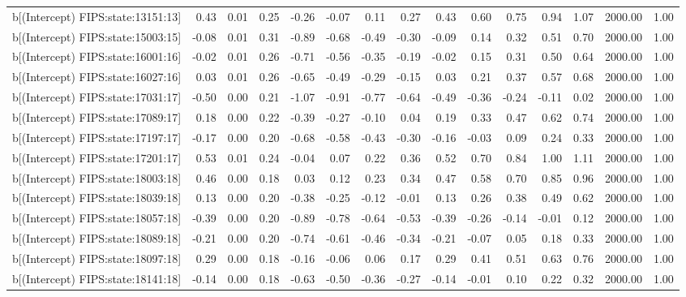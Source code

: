 \begin{table}[ht]
\begin{tabular}{rrrrrrrrrrrrrrr}
  b[(Intercept) FIPS:state:13151:13] & 0.43 & 0.01 & 0.25 & -0.26 & -0.07 & 0.11 & 0.27 & 0.43 & 0.60 & 0.75 & 0.94 & 1.07 & 2000.00 & 1.00 \\ 
  b[(Intercept) FIPS:state:15003:15] & -0.08 & 0.01 & 0.31 & -0.89 & -0.68 & -0.49 & -0.30 & -0.09 & 0.14 & 0.32 & 0.51 & 0.70 & 2000.00 & 1.00 \\ 
  b[(Intercept) FIPS:state:16001:16] & -0.02 & 0.01 & 0.26 & -0.71 & -0.56 & -0.35 & -0.19 & -0.02 & 0.15 & 0.31 & 0.50 & 0.64 & 2000.00 & 1.00 \\ 
  b[(Intercept) FIPS:state:16027:16] & 0.03 & 0.01 & 0.26 & -0.65 & -0.49 & -0.29 & -0.15 & 0.03 & 0.21 & 0.37 & 0.57 & 0.68 & 2000.00 & 1.00 \\ 
  b[(Intercept) FIPS:state:17031:17] & -0.50 & 0.00 & 0.21 & -1.07 & -0.91 & -0.77 & -0.64 & -0.49 & -0.36 & -0.24 & -0.11 & 0.02 & 2000.00 & 1.00 \\ 
  b[(Intercept) FIPS:state:17089:17] & 0.18 & 0.00 & 0.22 & -0.39 & -0.27 & -0.10 & 0.04 & 0.19 & 0.33 & 0.47 & 0.62 & 0.74 & 2000.00 & 1.00 \\ 
  b[(Intercept) FIPS:state:17197:17] & -0.17 & 0.00 & 0.20 & -0.68 & -0.58 & -0.43 & -0.30 & -0.16 & -0.03 & 0.09 & 0.24 & 0.33 & 2000.00 & 1.00 \\ 
  b[(Intercept) FIPS:state:17201:17] & 0.53 & 0.01 & 0.24 & -0.04 & 0.07 & 0.22 & 0.36 & 0.52 & 0.70 & 0.84 & 1.00 & 1.11 & 2000.00 & 1.00 \\ 
  b[(Intercept) FIPS:state:18003:18] & 0.46 & 0.00 & 0.18 & 0.03 & 0.12 & 0.23 & 0.34 & 0.47 & 0.58 & 0.70 & 0.85 & 0.96 & 2000.00 & 1.00 \\ 
  b[(Intercept) FIPS:state:18039:18] & 0.13 & 0.00 & 0.20 & -0.38 & -0.25 & -0.12 & -0.01 & 0.13 & 0.26 & 0.38 & 0.49 & 0.62 & 2000.00 & 1.00 \\ 
  b[(Intercept) FIPS:state:18057:18] & -0.39 & 0.00 & 0.20 & -0.89 & -0.78 & -0.64 & -0.53 & -0.39 & -0.26 & -0.14 & -0.01 & 0.12 & 2000.00 & 1.00 \\ 
  b[(Intercept) FIPS:state:18089:18] & -0.21 & 0.00 & 0.20 & -0.74 & -0.61 & -0.46 & -0.34 & -0.21 & -0.07 & 0.05 & 0.18 & 0.33 & 2000.00 & 1.00 \\ 
  b[(Intercept) FIPS:state:18097:18] & 0.29 & 0.00 & 0.18 & -0.16 & -0.06 & 0.06 & 0.17 & 0.29 & 0.41 & 0.51 & 0.63 & 0.76 & 2000.00 & 1.00 \\ 
  b[(Intercept) FIPS:state:18141:18] & -0.14 & 0.00 & 0.18 & -0.63 & -0.50 & -0.36 & -0.27 & -0.14 & -0.01 & 0.10 & 0.22 & 0.32 & 2000.00 & 1.00 \\ 

\end{tabular}
\end{table}
